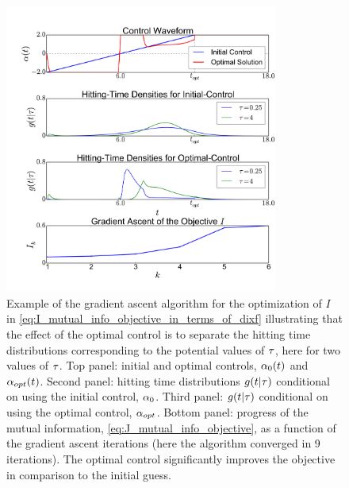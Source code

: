 \begin{figure}[htp] 
\begin{center}
\includegraphics[width=0.8\textwidth]{Figs/AdjointOptimizer/GradientAscent_Nt2.pdf}
\caption[Gradient Ascent for the Optimal Stimulation]{Example of the
    gradient ascent algorithm for the optimization of $I$ in
  \cref{eq:I_mutual_info_objective_in_terms_of_dixf} illustrating that the
  effect of the optimal control is to separate the
  hitting time distributions corresponding to the potential values of
  ${ \tau }$, here for two values of ${ \tau }$.
  Top
  panel: initial and optimal controls, $\alpha_{0}(t)$ and
  $\alpha_{opt}(t)$. Second panel: hitting time distributions $g(t|{ \tau })$ 
  conditional on 
  using the initial control, $\alpha_0$.
  Third panel: $g(t|{ \tau })$ conditional on using the
  optimal control, $\alpha_{opt}$.
 Bottom panel: progress of the mutual information,  
  \cref{eq:J_mutual_info_objective}, as a function of the gradient ascent
  iterations (here the algorithm converged in 9 iterations). The
  optimal control significantly improves the objective in comparison
  to the 
  initial guess.}
  \label{fig:example_gradient_ascent}   
\end{center}   
\end{figure}    
 
\

